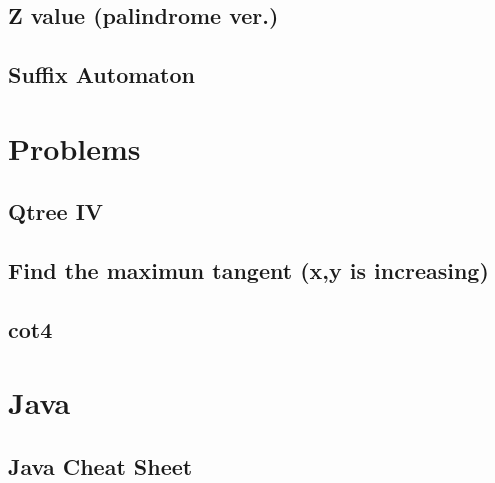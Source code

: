 \documentclass[10pt,twocolumn,oneside]{article}
\begin{document}
\subsection{Z value (palindrome ver.)}


\subsection{Suffix Automaton}


\section{Problems}
\subsection {Qtree IV}


\subsection{Find the maximun tangent (x,y is increasing)}


\subsection{cot4}


\section{Java}
\subsection{Java Cheat Sheet}

\end{document}
